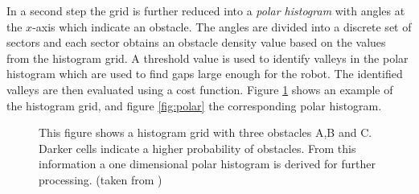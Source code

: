In a second step the grid is further reduced into a \emph{polar histogram} with angles at the $x$-axis which indicate an obstacle. 
The angles are divided into a discrete set of sectors and each sector obtains an obstacle density value based on the values from the histogram grid.
A threshold value is used to identify valleys in the polar histogram which are used to find gaps large enough for the robot.
The identified valleys are then evaluated using a cost function.
Figure \ref{fig:vfh} shows an example of the histogram grid, and figure \ref{fig:polar} the corresponding polar histogram.
\begin{figure}[thpb]
	  \myfloatalign
      \footnotesize
      \centering
   \caption[Vector Field Histogram Grid.]{This figure shows a histogram grid with three obstacles A,B and C. Darker cells indicate a higher probability of obstacles. From this information a one dimensional polar histogram is derived for further processing. (taken from \cite{borenstein1991vector})}
   \label{fig:vfh}
\end{figure}

